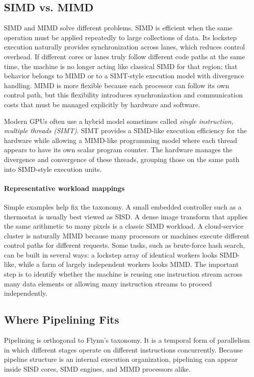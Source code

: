 \subsection{SIMD vs. MIMD}\label{subsec:auto-003}
SIMD and MIMD solve different problems.
SIMD is efficient when the same operation must be applied repeatedly to large collections of data.
Its lockstep execution naturally provides synchronization across lanes, which reduces control overhead.
If different cores or lanes truly follow different code paths at the same time, the machine is no longer acting like classical SIMD for that region; that behavior belongs to MIMD or to a SIMT-style execution model with divergence handling.
MIMD is more flexible because each processor can follow its own control path, but this flexibility introduces synchronization and communication costs that must be managed explicitly by hardware and software.

Modern GPUs often use a hybrid model sometimes called \textit{single instruction, multiple threads (SIMT)}.
SIMT provides a SIMD-like execution efficiency for the hardware while allowing a MIMD-like programming model where each thread appears to have its own scalar program counter.
The hardware manages the divergence and convergence of these threads, grouping those on the same path into SIMD-style execution units.

\paragraph{Representative workload mappings}\label{par:auto-007a}
Simple examples help fix the taxonomy.
A small embedded controller such as a thermostat is usually best viewed as SISD\@.
A dense image transform that applies the same arithmetic to many pixels is a classic SIMD workload.
A cloud-service cluster is naturally MIMD because many processors or machines execute different control paths for different requests.
Some tasks, such as brute-force hash search, can be built in several ways: a lockstep array of identical workers looks SIMD-like, while a farm of largely independent workers looks MIMD\@.
The important step is to identify whether the machine is reusing one instruction stream across many data elements or allowing many instruction streams to proceed independently.

\subsection{Where Pipelining Fits}\label{subsec:auto-004}
Pipelining is orthogonal to Flynn's taxonomy.
It is a temporal form of parallelism in which different stages operate on different instructions concurrently.
Because pipeline structure is an internal execution organization, pipelining can appear inside SISD cores, SIMD engines, and MIMD processors alike.


